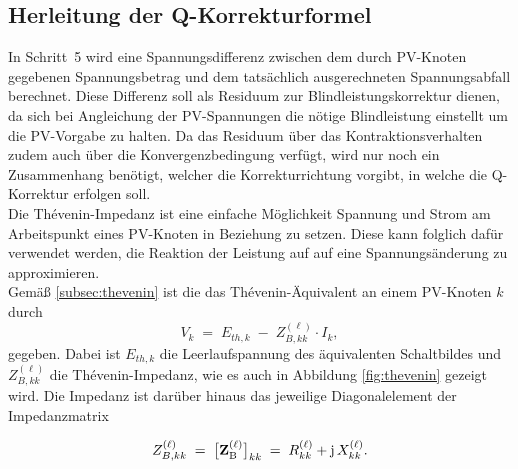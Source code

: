 \subsection{Herleitung der Q-Korrekturformel}
\label{subsec:methode_a_herleitung}


In Schritt~5 wird eine Spannungsdifferenz zwischen dem durch PV-Knoten gegebenen Spannungsbetrag und dem tatsächlich ausgerechneten Spannungsabfall berechnet.
Diese Differenz soll als Residuum zur Blindleistungskorrektur dienen, da sich bei Angleichung der PV-Spannungen die nötige Blindleistung einstellt um die PV-Vorgabe zu halten.
Da das Residuum über das Kontraktionsverhalten zudem auch über die Konvergenzbedingung verfügt, wird nur noch ein Zusammenhang benötigt, welcher die Korrekturrichtung vorgibt, in welche die Q-Korrektur erfolgen soll.\\


Die Thévenin-Impedanz ist eine einfache Möglichkeit Spannung und Strom am Arbeitspunkt eines PV-Knoten in Beziehung zu setzen.
Diese kann folglich dafür verwendet werden, die Reaktion der Leistung auf auf eine Spannungsänderung zu approximieren.\\


Gemäß \cref{subsec:thevenin} ist die das Thévenin-Äquivalent an einem PV-Knoten $k$ durch
\begin{equation}
	V_k \;=\; E_{th,k} \;-\; Z^{(\ell)}_{B,kk}\cdot I_k,
	\label{eq:thevenin_skalar}
\end{equation}
gegeben. Dabei ist $E_{th,k}$ die Leerlaufspannung des äquivalenten Schaltbildes und $Z^{(\ell)}_{B,kk}$ die Thévenin-Impedanz, wie es auch in Abbildung \ref{fig:thevenin} gezeigt wird. 
Die Impedanz ist darüber hinaus das jeweilige Diagonalelement der Impedanzmatrix 


\begin{equation}
	Z^{(\ell)}_{B,kk} \;=\; \bigl[\mathbf{Z}_\mathrm{B}^{(\ell)}\bigr]_{kk}
	\;=\; R^{(\ell)}_{kk} + \mathrm{j}\,X^{(\ell)}_{kk}.
	\label{eq:diagonalelement}
\end{equation}

